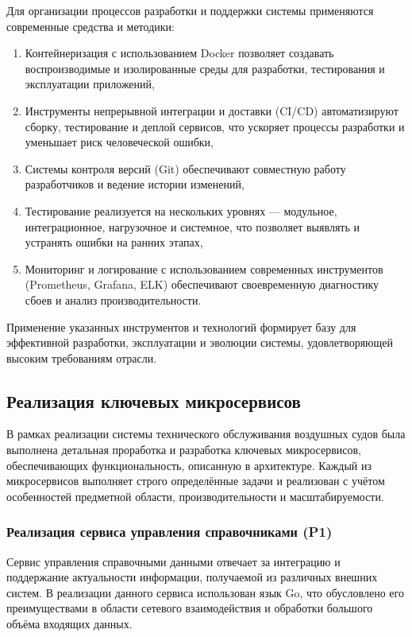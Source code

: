 \documentclass[14pt,a4paper]{extarticle}
\begin{document}
Для организации процессов разработки и поддержки системы применяются современные средства и методики:

\begin{enumerate}
\item Контейнеризация с использованием Docker позволяет создавать воспроизводимые и изолированные среды для разработки, тестирования и эксплуатации приложений,

\item Инструменты непрерывной интеграции и доставки (CI/CD) автоматизируют сборку, тестирование и деплой сервисов, что ускоряет процессы разработки и уменьшает риск человеческой ошибки,

\item Системы контроля версий (Git) обеспечивают совместную работу разработчиков и ведение истории изменений,

\item Тестирование реализуется на нескольких уровнях — модульное, интеграционное, нагрузочное и системное, что позволяет выявлять и устранять ошибки на ранних этапах,

\item Мониторинг и логирование с использованием современных инструментов (Prometheus, Grafana, ELK) обеспечивают своевременную диагностику сбоев и анализ производительности.
\end{enumerate}

Применение указанных инструментов и технологий формирует базу для эффективной разработки, эксплуатации и эволюции системы, удовлетворяющей высоким требованиям отрасли.

\subsection{Реализация ключевых микросервисов}

В рамках реализации системы технического обслуживания воздушных судов была выполнена детальная проработка и разработка ключевых микросервисов, обеспечивающих функциональность, описанную в архитектуре. Каждый из микросервисов выполняет строго определённые задачи и реализован с учётом особенностей предметной области, производительности и масштабируемости.

\subsubsection{Реализация сервиса управления справочниками (P1)}

Сервис управления справочными данными отвечает за интеграцию и поддержание актуальности информации, получаемой из различных внешних систем. В реализации данного сервиса использован язык Go, что обусловлено его преимуществами в области сетевого взаимодействия и обработки большого объёма входящих данных.
\end{document}
